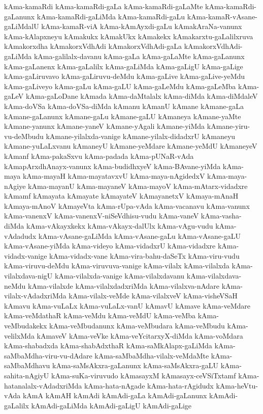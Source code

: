 {kAma-kamaRdi
kAma-kamaRdi-gaLa
kAma-kamaRdi-gaLaMte
kAma-kamaRdi-gaLanunx
kAma-kamaRdi-gaLiMda
kAma-kamaRdi-gaLu
kAma-kamaR-vAsane-gaLiMdalU
kAma-kamaR-viA
kAma-kAmAyxdi-gaLu
kAmakAraNa-vanunx
kAma-kAlapxneyu
kAmakukx
kAmakUkx
kAmakekx
kAmakarxtu-gaLalilxruva
kAmakorxdha
kAmakorxVdhAdi
kAmakorxVdhAdi-gaLa
kAmakorxVdhAdi-gaLiMda
kAma-galilalx-davanu
kAma-gaLa
kAma-gaLaMte
kAma-gaLanunx
kAma-gaLanenx
kAma-gaLalilx
kAma-gaLiMda
kAma-gaLigU
kAma-gaLige
kAma-gaLiruvavo
kAma-gaLiruvu-deMdu
kAma-gaLive
kAma-gaLive-yeMdu
kAma-gaLiveyo
kAma-gaLu
kAma-gaLU
kAma-gaLeMdu
kAma-gaLeMba
kAma-gaLeV
kAma-gaLoDane
kAmada
kAma-daMtalalx
kAma-diMda
kAma-diMdaleV
kAma-doVSa
kAma-doVSa-diMda
kAmanu
kAmanU
kAmane
kAmane-gaLa
kAmane-gaLanunx
kAmane-gaLu
kAmane-gaLU
kAmaneya
kAmane-yaMte
kAmane-yanunx
kAmane-yaneV
kAmane-yAgali
kAmane-yiMda
kAmane-yiru-vu-deMbudu
kAmane-yilalxda-vanige
kAmane-yilalx-didadxrU
kAmaneyu
kAmane-yuLaLxvanu
kAmaneyU
kAmane-yeMdare
kAmane-yeMdU
kAmaneyeV
kAmanf
kAma-pakaSxvu
kAma-padada
kAma-pUNaR-vAda
kAmapArxdhAnayx-vanunx
kAma-budidhxyeV
kAma-BAvane-yiMda
kAma-maya
kAma-mayaH
kAma-mayatavxvU
kAma-maya-nAgidedxV
kAma-maya-nAgiye
kAma-mayanU
kAma-mayaneV
kAma-mayoV
kAma-mAtarx-vidadxre
kAmamf
kAmayata
kAmayate
kAmayateV
kAmayanetxV
kAmaya-mAnaH
kAmaya-mAnoV
kAmayeVta
kAma-rUpa-vAda
kAma-vacanavu
kAma-vanunx
kAma-vanenxV
kAma-vanenxV-niSeVdhisu-vudu
kAma-vaneV
kAma-vasha-diMda
kAma-vAkayxkekx
kAma-vAkayx-dalUlx
kAma-vAgu-vudu
kAma-vAdadudx
kAma-vAsane-gaLiMda
kAma-vAsane-gaLu
kAma-vAsane-gaLU
kAma-vAsane-yiMda
kAma-videyo
kAma-vidadxrU
kAma-vidadxre
kAma-vidadx-vanige
kAma-vidadx-vane
kAma-vira-bahu-daSeTx
kAma-viru-vudu
kAma-viruvu-deMdu
kAma-viruvuva-vanige
kAma-vilalx
kAma-vilalxda
kAma-vilalxdava-nigU
kAma-vilalxda-vanige
kAma-vilalxdavanu
kAma-vilalxdava-neMdu
kAma-vilalxde
kAma-vilalxdadxriMda
kAma-vilalxva-nAdare
kAma-vilalx-vAdadxriMda
kAma-vilalx-veMde
kAma-vilalxveV
kAma-visheVSaH
kAmavu
kAma-vuLaLx
kAma-vuLaLx-vanU
kAmavU
kAmave
kAma-veMdare
kAma-veMdathaR
kAma-veMdu
kAma-veMdU
kAma-veMba
kAma-veMbudakekx
kAma-veMbudanunx
kAma-veMbudara
kAma-veMbudu
kAma-velilxMda
kAmaveV
kAma-veVke
kAma-veYcitarxyX-diMda
kAma-voMdara
kAma-shabadxda
kAma-shabAdxthaR
kAma-saMkAlapx-gaLiMda
kAma-saMbaMdha-viru-vu-dAdare
kAma-saMbaMdha-vilalx-veMdaMte
kAma-saMbaMdhavu
kAma-saMsAkxra-gaLanunx
kAma-saMsAkxra-gaLU
kAma-sahita-nAgiyU
kAma-suKa-viruvudo
kAmasayxM
kAmasayx-ceVSiTxtamf
kAma-hatanalalx-vAdadxriMda
kAma-hata-nAgade
kAma-hata-rAgidudx
kAma-heVtu-vAda
kAmA
kAmAH
kAmAdi
kAmAdi-gaLa
kAmAdi-gaLanunx
kAmAdi-gaLalilx
kAmAdi-gaLiMda
kAmAdi-gaLigU
kAmAdi-gaLige
}
